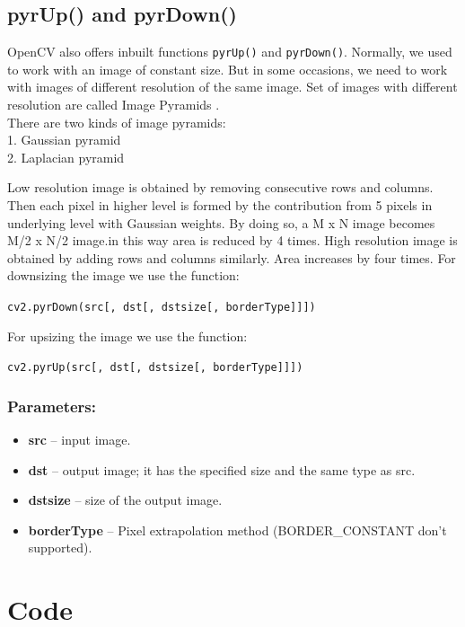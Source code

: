 \documentclass[]{article}
\providecommand{\tightlist}{%
  \setlength{\itemsep}{0pt}\setlength{\parskip}{0pt}}
\begin{document}
\subsection{pyrUp() and pyrDown()}\label{pyrup-and-pyrdown}

OpenCV also offers inbuilt functions \texttt{pyrUp()} and
\texttt{pyrDown()}. Normally, we used to work with an image of constant
size. But in some occasions, we need to work with images of different
resolution of the same image. Set of images with different resolution
are called Image Pyramids .\\
There are two kinds of image pyramids:\\
1. Gaussian pyramid\\
2. Laplacian pyramid

Low resolution image is obtained by removing consecutive rows and
columns. Then each pixel in higher level is formed by the contribution
from 5 pixels in underlying level with Gaussian weights. By doing so, a
M x N image becomes M/2 x N/2 image.in this way area is reduced by 4
times. High resolution image is obtained by adding rows and columns
similarly. Area increases by four times. For downsizing the image we use
the function:

\texttt{cv2.pyrDown(src{[},\ dst{[},\ dstsize{[},\ borderType{]}{]}{]})}

For upsizing the image we use the function:

\texttt{cv2.pyrUp(src{[},\ dst{[},\ dstsize{[},\ borderType{]}{]}{]})}

\subsubsection{Parameters:}\label{parameters-1}

\begin{itemize}
\tightlist
\item
  \textbf{src} -- input image.
\item
  \textbf{dst} -- output image; it has the specified size and the same
  type as src.
\item
  \textbf{dstsize} -- size of the output image.
\item
  \textbf{borderType} -- Pixel extrapolation method (BORDER\_CONSTANT
  don't supported).
\end{itemize}

\section{Code}\label{code-1}
\end{document}
